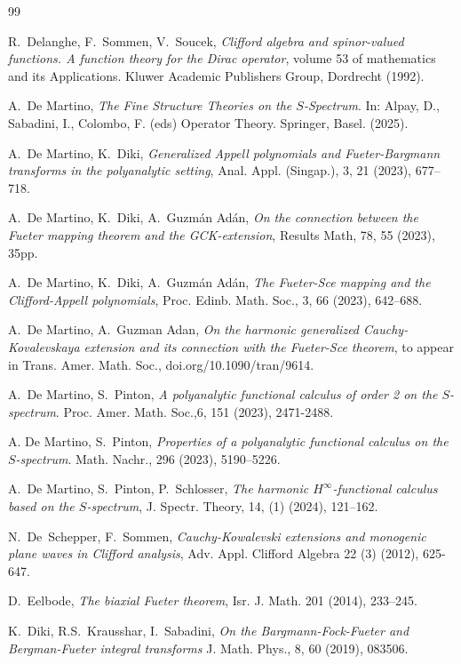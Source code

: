 \documentclass[reqno,11pt]{amsart}
\numberwithin{equation}{section}
\theoremstyle{definition}
\begin{document}
\begin{thebibliography}{99}
	
	 R.~Delanghe, F.~Sommen, V.~Soucek, \emph{Clifford algebra and spinor-valued functions. A function theory for the Dirac operator}, volume 53 of mathematics and its Applications. Kluwer Academic Publishers Group, Dordrecht (1992).
	
	 A.~De Martino, \emph{The Fine Structure Theories on the $S$-Spectrum}. In: Alpay, D., Sabadini, I., Colombo, F. (eds) Operator Theory. Springer, Basel. (2025).
	

	
	 A.~De Martino, K.~Diki, \emph{ Generalized Appell polynomials and Fueter-Bargmann transforms in the polyanalytic setting}, Anal. Appl. (Singap.), 3, 21 (2023), 677–718.
	
	 A.~De Martino, K.~Diki, A.~Guzmán Adán, \emph{On the connection between the Fueter mapping theorem and the GCK-extension}, Results Math,  78, 55 (2023), 35pp.
	
	
	 A.~De Martino, K.~Diki, A.~Guzmán Adán, \emph{The Fueter-Sce mapping and the Clifford-Appell polynomials}, Proc. Edinb. Math. Soc., 3, 66 (2023), 642–688.
	
	 A.~De Martino, A.~Guzman Adan, \emph{On the harmonic generalized Cauchy-Kovalevskaya extension and its connection with the Fueter-Sce theorem}, to appear in Trans. Amer. Math. Soc., doi.org/10.1090/tran/9614.
	
	
	
	 A.~De Martino, S.~Pinton, \textit{A polyanalytic functional calculus of order 2 on the $S$-spectrum}. Proc. Amer. Math. Soc.,6, 151 (2023), 2471-2488.
	
	 A. De Martino, S.~Pinton, \textit{Properties of a polyanalytic functional calculus on the $S$-spectrum}. Math. Nachr., 296 (2023), 5190–5226.
	
	
	 A.~De Martino, S.~Pinton, P.~Schlosser, \emph{The harmonic $H^\infty$-functional calculus based on the $S$-spectrum}, J. Spectr. Theory, 14, (1) (2024), 121–162.
	
	
	N.~De~Schepper, F.~Sommen, \emph{Cauchy-Kowalevski extensions and monogenic plane waves in Clifford analysis}, Adv. Appl. Clifford Algebra
	22 (3) (2012), 625-647.
	
	
	 D.~Eelbode, \emph{The biaxial Fueter theorem}, Isr. J. Math. 201  (2014), 233–245.
	
	 K.~Diki, R.S.~Krausshar, I.~Sabadini,
	\emph{On the {B}argmann-{F}ock-{F}ueter and {B}ergman-{F}ueter integral
		transforms} J. Math. Phys., 8,  60 (2019), 083506.
		

\end{thebibliography}
\end{document}
